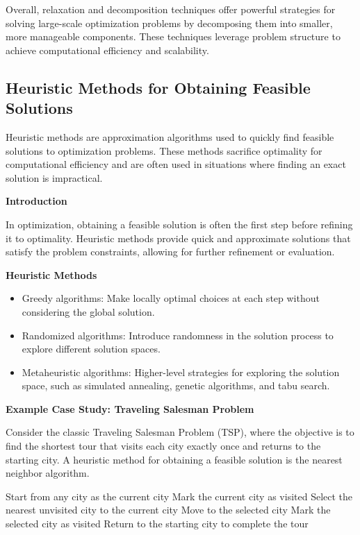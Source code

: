 \documentclass[12pt]{book} %
\begin{document}
Overall, relaxation and decomposition techniques offer powerful strategies for solving large-scale optimization problems by decomposing them into smaller, more manageable components. These techniques leverage problem structure to achieve computational efficiency and scalability.


\subsection{Heuristic Methods for Obtaining Feasible Solutions}

Heuristic methods are approximation algorithms used to quickly find feasible solutions to optimization problems. These methods sacrifice optimality for computational efficiency and are often used in situations where finding an exact solution is impractical.

\textbf{Introduction}

In optimization, obtaining a feasible solution is often the first step before refining it to optimality. Heuristic methods provide quick and approximate solutions that satisfy the problem constraints, allowing for further refinement or evaluation.

\textbf{Heuristic Methods}

\begin{itemize}
    \item Greedy algorithms: Make locally optimal choices at each step without considering the global solution.
    \item Randomized algorithms: Introduce randomness in the solution process to explore different solution spaces.
    \item Metaheuristic algorithms: Higher-level strategies for exploring the solution space, such as simulated annealing, genetic algorithms, and tabu search.
\end{itemize}

\textbf{Example Case Study: Traveling Salesman Problem}

Consider the classic Traveling Salesman Problem (TSP), where the objective is to find the shortest tour that visits each city exactly once and returns to the starting city. A heuristic method for obtaining a feasible solution is the nearest neighbor algorithm.
\FloatBarrier
\begin{algorithm}
\caption{Nearest Neighbor Algorithm for TSP}
\begin{algorithmic}[1]
\State Start from any city as the current city
\State Mark the current city as visited
    \State Select the nearest unvisited city to the current city
    \State Move to the selected city
    \State Mark the selected city as visited
\EndWhile
\State Return to the starting city to complete the tour
\end{algorithmic}
\end{algorithm}
\FloatBarrier
\end{document}
